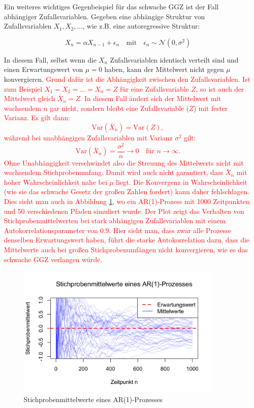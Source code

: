 \documentclass[aodsor,preprint]{imsart}
\numberwithin{equation}{section}
\theoremstyle{plain}
\begin{document}
Ein weiteres wichtiges Gegenbeispiel für das schwache GGZ ist der Fall abhängiger Zufallsvariablen.
Gegeben eine abhängige Struktur von Zufallsvariablen \(X_1, X_2, \dots\), wie z.B. eine autoregressive Struktur:

\[
X_n = \alpha X_{n-1} + \epsilon_n \quad \text{mit} \quad \epsilon_n \sim \mathcal{N}(0, \sigma^2)
\]

In diesem Fall, selbst wenn die \(X_n\) Zufallsvariablen identisch verteilt sind und einen Erwartungswert von \(\mu = 0\) haben, kann der Mittelwert nicht gegen \(\mu\) konvergieren.
\textcolor{red}{
Grund dafür ist die Abhängigkeit zwischen den Zufallsvariablen. Ist zum Beispiel \(X_1 = X_2 = \dots = X_n = Z\) für eine Zufallsvariable \(Z\), so ist auch der Mittelwert gleich \(\bar{X}_n = Z\). In diesem Fall ändert sich der Mittelwert mit wachsendem \(n\) gar nicht, sondern bleibt eine Zufallsvariable (\(Z\)) mit fester Varianz. Es gilt dann:
\[
\text{Var}(\bar{X}_n) = \text{Var}(Z),
\]
während bei unabhängigen Zufallsvariablen mit Varianz \(\sigma^2\) gilt:
\[
\text{Var}(\bar{X}_n) = \frac{\sigma^2}{n} \to 0 \quad \text{für } n \to \infty.
\]
Ohne Unabhängigkeit verschwindet also die Streuung des Mittelwerts nicht mit wachsendem Stichprobenumfang.
Damit wird auch nicht garantiert, dass \(\bar{X}_n\) mit hoher Wahrscheinlichkeit nahe bei \(\mu\) liegt.
Die Konvergenz in Wahrscheinlichkeit (wie sie das schwache Gesetz der großen Zahlen fordert) kann daher fehlschlagen.
Dies sieht man auch in Abbildung \ref{fig:ar1}, wo ein AR(1)-Prozess mit 1000 Zeitpunkten und 50 verschiedenen Pfaden simuliert wurde.
Der Plot zeigt das Verhalten von Stichprobenmittelwerten bei stark abhängigen Zufallsvariablen mit einem Autokorrelationsparameter von 0.9.
Hier sieht man, dass zwar alle Prozesse denselben Erwartungswert haben, führt die starke Autokorrelation dazu, dass die Mittelwerte auch bei großen Stichprobenumfängen nicht konvergieren, wie es das schwache GGZ verlangen würde.
}


\begin{figure}[h!]
  \centering
  \includegraphics[width=0.9\textwidth]{ar1.png}
  \caption{Stichprobenmittelwerte eines AR(1)-Prozesses}
  \label{fig:ar1}
\end{figure}
\end{document}
